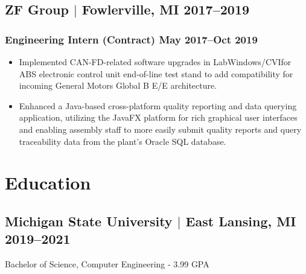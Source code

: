 \documentclass[11pt]{article}
\begin{document}
\subsection{ZF Group $|$ {\normalfont Fowlerville, MI} \hfill 2017--2019}

\subsubsection{Engineering Intern (Contract) \hfill May 2017--Oct 2019}
\begin{itemize}
  \item Implemented CAN-FD-related software upgrades in LabWindows/CVIfor ABS electronic control 
  unit end-of-line test stand to add compatibility for incoming General Motors 
  Global B E/E architecture.
  \item Enhanced a Java-based cross-platform quality reporting and data 
  querying application, utilizing the JavaFX platform for rich graphical user 
  interfaces and enabling assembly staff to more easily submit quality reports 
  and query traceability data from the plant's Oracle SQL database.
\end{itemize}

\section{Education}
\subsection{Michigan State University $|$ {\normalfont East Lansing, MI} \hfill 2019--2021}
\noindent Bachelor of Science, Computer Engineering - 3.99 GPA
\end{document}
